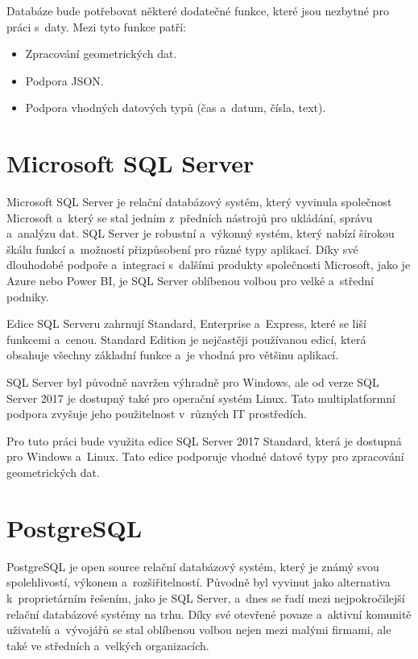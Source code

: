 Databáze bude potřebovat některé dodatečné funkce, které jsou nezbytné pro práci s~daty.
Mezi tyto funkce patří:
\begin{itemize}
    \item Zpracování geometrických dat.
    \item Podpora JSON.
    \item Podpora vhodných datových typů (čas a~datum, čísla, text).
\end{itemize}

\section{Microsoft SQL Server}
Microsoft SQL Server je relační databázový systém, který vyvinula společnost
Microsoft a~který se stal jedním z~předních nástrojů pro ukládání, správu a~analýzu dat.
SQL Server je robustní a~výkonný systém, který nabízí širokou škálu funkcí
a~možností přizpůsobení pro různé typy aplikací. Díky své dlouhodobé podpoře a~integraci
s~dalšími produkty společnosti Microsoft, jako je Azure nebo Power BI, je SQL Server
oblíbenou volbou pro velké a~střední podniky.

Edice SQL Serveru zahrnují Standard, Enterprise a~Express,
které se liší funkcemi a~cenou. Standard Edition je nejčastěji používanou edicí,
která obsahuje všechny základní funkce a~je vhodná pro většinu aplikací.

SQL Server byl původně navržen výhradně pro Windows, ale od verze SQL Server 2017 je dostupný
také pro operační systém Linux. Tato multiplatformní podpora zvyšuje jeho použitelnost
v~různých IT prostředích.
\cite{microsoft_sql_server}

Pro tuto práci bude využita edice SQL Server 2017 Standard, která je dostupná pro Windows a~Linux.
Tato edice podporuje vhodné datové typy pro zpracování geometrických dat.

\section{PostgreSQL}
PostgreSQL je open source relační databázový systém, který je známý svou spolehlivostí, výkonem
a~rozšiřitelností. Původně byl vyvinut jako alternativa k~proprietárním řešením, jako je SQL Server,
a~dnes se řadí mezi nejpokročilejší relační databázové systémy na trhu. Díky své otevřené povaze
a~aktivní komunitě uživatelů a~vývojářů se stal oblíbenou volbou nejen mezi malými firmami,
ale také ve středních a~velkých organizacích.

